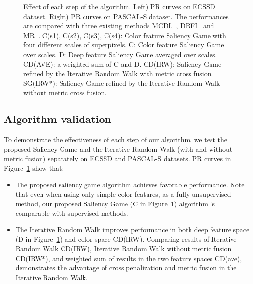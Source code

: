 \documentclass[journal]{IEEEtran}
\begin{document}
\begin{figure}[t]
\vspace{-10pt}
\caption{Effect of each step of the algorithm. Left) PR curves on ECSSD dataset. Right) PR curves on PASCAL-S dataset. The performances are compared with three existing methods MCDL~\cite{zhao2015saliency}, DRFI~\cite{jiang2013salient} and MR~\cite{yang2013saliency}. C(s1), C(s2), C(s3), C(s4): Color feature Saliency Game with four different scales of superpixels. C: Color feature Saliency Game over scales. D: Deep feature Saliency Game averaged over scales. CD(AVE): a weighted sum of C and D. CD(IRW): Saliency Game refined by the Iterative Random Walk with metric cross fusion. SG(IRW*): Saliency Game refined by the Iterative Random Walk without metric cross fusion.}
\label{fig:6}
\end{figure}

\subsection{Algorithm validation}
To demonstrate the effectiveness of each step of our algorithm, we test the proposed Saliency Game and the Iterative Random Walk (with and without metric fusion) separately on ECSSD and PASCAL-S datasets. PR curves in Figure~\ref{fig:6} show that:
\begin{itemize}
\item The proposed saliency game algorithm achieves favorable performance. Note that even when using only simple color features, as a fully unsupervised method, our proposed Saliency Game (C in Figure~\ref{fig:6}) algorithm is comparable with supervised methods.
\item The Iterative Random Walk improves performance in both deep feature space (D in Figure~\ref{fig:6}) and color space CD(IRW). Comparing results of Iterative Random Walk CD(IRW), Iterative Random Walk without metric fusion CD(IRW*), and weighted sum of results in the two feature spaces CD(ave), demonstrates the advantage of cross penalization and metric fusion in the Iterative Random Walk.
\end{itemize}
\end{document}
